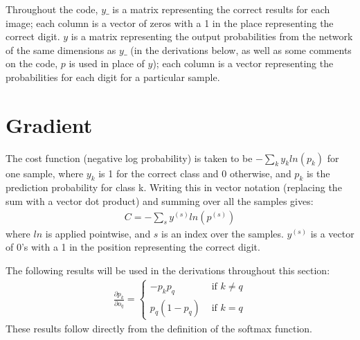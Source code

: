 \documentclass{article}
\begin{document}
   Throughout the code, $y\_$ is a matrix representing the correct results for each image; each column is a
   vector of zeros with a 1 in the place representing the correct digit.
   $y$ is a matrix representing the output probabilities from the network of the same dimensions
   as $y\_$ (in the derivations below, as well as some comments on the code, $p$ is used in place of $y$);
   each column is a vector representing the probabilities for each digit for a particular sample.

   \section{Gradient}
   The cost function (negative log probability) is taken to be $- \sum_{k} y_k ln(p_k)$ for one sample, where $y_k$ is
   1 for the correct class and 0 otherwise, and $p_k$ is the prediction probability for class k.
   Writing this in vector notation (replacing the sum with a vector dot product) and
   summing over all the samples gives:
      \begin{equation*} \begin{split}
         C = - \sum_{s} y^{(s)} ln(p^{(s)})
      \end{split} \end{equation*}
   where $ln$ is applied pointwise, and $s$ is an index over the samples. $y^{(s)}$ is
   a vector of 0's with a 1 in the position representing the correct digit.

   The following results will be used in the derivations throughout this section:
      \begin{equation*} \begin{split}
        \frac{ \partial p_k}{ \partial o_q } =
            \begin{cases}
               -p_k p_q       & \textrm{ if } k \neq q \\
               p_q (1 - p_q)  & \textrm{ if } k = q
            \end{cases}
      \end{split} \end{equation*}
   These results follow directly from the definition of the softmax function.
\end{document}
